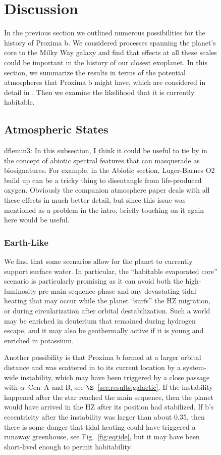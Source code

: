 \documentclass[preprint,12pt]{aastex}
\newcommand{\xxx}[1]{{\color{red} #1}} %
\def\acen{{$\alpha$~Cen}}
\begin{document}
\begin{figure}
\section{Discussion\label{sec:disc}}

In the previous section we outlined numerous possibilities for the
history of Proxima b. We considered processes spanning the planet's
core to the Milky Way galaxy and find that effects at all these scales
could be important in the history of our closest exoplanet. In this
section, we summarize the results in terms of the potential
atmospheres that Proxima b might have, which are considered in
detail in \citep{Meadows16}. Then we examine the likelihood that it is
currently habitable.

\subsection{Atmospheric States}
\label{sec:results:atmstates}

\xxx{dflemin3:  In this subsection, I think it could be useful to tie by in the concept of abiotic spectral features that can 
masquerade as biosignatures.  For example, in the Abiotic section, Luger-Barnes O2 build up can be a tricky thing to
disentangle from life-produced oxygen.  Obviously the companion atmosphere paper deals with all these effects in much
better detail, but since this issue was mentioned as a problem in the intro, briefly touching on it again here would be useful.}

\subsubsection{Earth-Like}
\label{sec:results:atmstates:earthlike}

We find that some scenarios allow for the planet to currently support
surface water. In particular, the ``habitable evaporated core'' scenario
\citep{Luger15} is particularly promising as it can avoid both the
high-luminosity pre-main sequence phase and any devastating tidal
heating that may occur while the planet ``surfs'' the HZ migration, or
during circularization after orbital destabilization. Such a world may
be enriched in deuterium that remained during hydrogen escape, and it
may also be geothermally active if it is young and enriched in
potassium.

Another possibility is that Proxima b formed at a larger orbital
distance and was scattered in to its current location by a system-wide
instability, which may have been triggered by a close passage with
\acen~A and B, see $\S$~\ref{sec:results:galactic}. If the instability
happened after the star reached the main sequence, then the planet
would have arrived in the HZ after its position had stabilized. If b's
eccentricity after the instability was larger than about 0.35, then
there is some danger that tidal heating could have triggered a runaway
greenhouse, see Fig.~\ref{fig:eqtide}, but it may have been
short-lived enough to permit habitability.


\end{figure}
\end{document}
